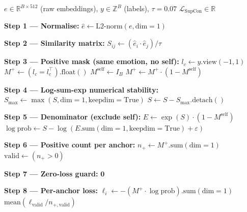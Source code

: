 \documentclass[12pt,a4paper]{article}
\theoremstyle{definition}
\theoremstyle{remark}
\begin{document}
\begin{algorithm}[H]
\caption{Supervised Contrastive Loss (Phase 3 implementation)}
\label{alg:supcon}
\begin{algorithmic}[1]
\Require $e \in \mathbb{R}^{B \times 512}$ (raw embeddings),
         $y \in \mathbb{Z}^B$ (labels), $\tau = 0.07$
\Ensure $\mathcal{L}_{\text{SupCon}} \in \mathbb{R}$

\State \textbf{Step 1 — Normalise:}
\State $\hat{e} \gets \text{L2-norm}(e, \text{dim}=1)$

\State \textbf{Step 2 — Similarity matrix:}
\State $S_{ij} \gets (\hat{e}_i \cdot \hat{e}_j) / \tau$

\State \textbf{Step 3 — Positive mask (same emotion, no self):}
\State $l_c \gets y.\text{view}(-1, 1)$ 
\State $M^+ \gets (l_c = l_c^\top).\text{float}()$ 
\State $M^{\text{self}} \gets I_B$ 
\State $M^+ \gets M^+ \cdot (1 - M^{\text{self}})$ 

\State \textbf{Step 4 — Log-sum-exp numerical stability:}
\State $S_{\max} \gets \max(S, \text{dim}=1, \text{keepdim}=\text{True})$
\State $S \gets S - S_{\max}.\text{detach}()$

\State \textbf{Step 5 — Denominator (exclude self):}
\State $E \gets \exp(S) \cdot (1 - M^{\text{self}})$ \Comment{$[B,B]$}
\State $\log\text{prob} \gets S - \log(E.\text{sum}(\text{dim}=1, \text{keepdim}=\text{True}) + \varepsilon)$
       \Comment{$[B,B]$}

\State \textbf{Step 6 — Positive count per anchor:}
\State $n_+ \gets M^+.\text{sum}(\text{dim}=1)$ \Comment{$[B]$}
\State $\text{valid} \gets (n_+ > 0)$ 

\State \textbf{Step 7 — Zero-loss guard:}
  \State \Return $\mathbf{0}$ 
\EndIf

\State \textbf{Step 8 — Per-anchor loss:}
\State $\ell_i \gets -(M^+ \cdot \log\text{prob}).\text{sum}(\text{dim}=1)$ \Comment{$[B]$}
\State \Return $\text{mean}(\ell_{\text{valid}} / n_{+,\text{valid}})$ 
\end{algorithmic}
\end{algorithm}
\end{document}
